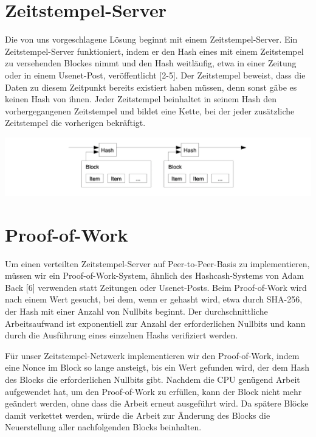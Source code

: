 \documentclass[9pt]{article}
\begin{document}
	\section{Zeitstempel-Server}
	
    Die von uns vorgeschlagene Lösung beginnt mit einem Zeitstempel-Server. Ein Zeitstempel-Server funktioniert, indem er den Hash eines mit einem Zeitstempel zu versehenden Blockes nimmt und den Hash weitläufig, etwa in einer Zeitung oder in einem Usenet-Post, veröffentlicht [2-5]. Der Zeitstempel beweist, dass die Daten zu diesem Zeitpunkt bereits existiert haben müssen, denn sonst gäbe es keinen Hash von ihnen. Jeder Zeitstempel beinhaltet in seinem Hash den vorhergegangenen Zeitstempel und bildet eine Kette, bei der jeder zusätzliche Zeitstempel die vorherigen bekräftigt.
    
	\begin{center}
		\includegraphics[width=.9\textwidth]{pics/timestampserver.png}
	\end{center}

	\newpage
	
	\section{Proof-of-Work}
	
	Um einen verteilten Zeitstempel-Server auf Peer-to-Peer-Basis zu implementieren, müssen wir ein Proof-of-Work-System, ähnlich des Hashcash-Systems von Adam Back [6] verwenden statt Zeitungen oder Usenet-Posts. Beim Proof-of-Work wird nach einem Wert gesucht, bei dem, wenn er gehasht wird, etwa durch SHA-256, der Hash mit einer Anzahl von Nullbits beginnt. Der durchschnittliche Arbeitsaufwand ist exponentiell zur Anzahl der erforderlichen Nullbits und kann durch die Ausführung eines einzelnen Hashs verifiziert werden.
	
    Für unser Zeitstempel-Netzwerk implementieren wir den Proof-of-Work, indem eine Nonce im Block so lange ansteigt, bis ein Wert gefunden wird, der dem Hash des Blocks die erforderlichen Nullbits gibt. Nachdem die CPU genügend Arbeit aufgewendet hat, um den Proof-of-Work zu erfüllen, kann der Block nicht mehr geändert werden, ohne dass die Arbeit erneut ausgeführt wird. Da spätere Blöcke damit verkettet werden, würde die Arbeit zur Änderung des Blocks die Neuerstellung aller nachfolgenden Blocks beinhalten.
	
\end{document}
